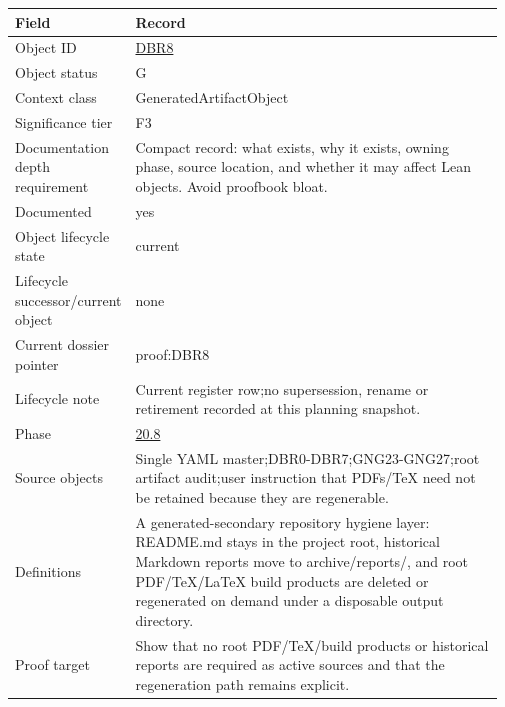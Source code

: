 \begin{longtable}{L{0.16\linewidth} L{0.81\linewidth}}
\hline
\textbf{Field} & \textbf{Record}\\
\hline
Object ID & \hyperlink{object-row-DBR8}{DBR8}\\
\hline\addlinespace[0.20em]
Object status & G\\
\hline\addlinespace[0.20em]
Context class & GeneratedArtifactObject\\
\hline\addlinespace[0.20em]
Significance tier & F3\\
\hline\addlinespace[0.20em]
Documentation depth requirement & Compact record: what exists, why it exists, owning phase, source location, and whether it may affect Lean objects. Avoid proofbook bloat.\\
\hline\addlinespace[0.20em]
Documented & yes\\
\hline\addlinespace[0.20em]
Object lifecycle state & current\\
\hline\addlinespace[0.20em]
Lifecycle successor/\allowbreak{}current object & none\\
\hline\addlinespace[0.20em]
Current dossier pointer & proof:DBR8\\
\hline\addlinespace[0.20em]
Lifecycle note & Current register row;\newline no supersession, rename or retirement recorded at this planning snapshot.\\
\hline\addlinespace[0.20em]
Phase & \hyperlink{phase-row-20-8}{20.8}\\
\hline\addlinespace[0.20em]
Source objects & Single YAML master;\newline DBR0-DBR7;\newline GNG23-GNG27;\newline root artifact audit;\newline user instruction that PDFs/\allowbreak{}TeX need not be retained because they are regenerable.\\
\hline\addlinespace[0.20em]
Definitions & A generated-secondary repository hygiene layer: README.md stays in the project root, historical Markdown reports move to archive/\allowbreak{}reports/\allowbreak{}, and root PDF/\allowbreak{}TeX/\allowbreak{}LaTeX build products are deleted or regenerated on demand under a disposable output directory.\\
\hline\addlinespace[0.20em]
Proof target & Show that no root PDF/\allowbreak{}TeX/\allowbreak{}build products or historical reports are required as active sources and that the regeneration path remains explicit.\\

\end{longtable}

